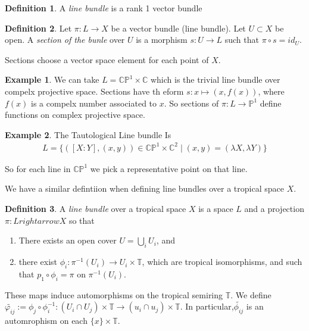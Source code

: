 \documentclass[11pt]{article}
\theoremstyle{definition}
\newtheorem{protoexample}{Example}[section]
\newenvironment{ex}
   {\begin{protoexample}}
   {\end{protoexample}}
\newtheorem{protodefinition}{Definition}[section]
\newenvironment{define}
   {\begin{protodefinition}}
   {\end{protodefinition}}
\def\CC{{\mathbb C}}
\def\TT{{\mathbb T}}
\def\PP{{\mathbb P}}
\begin{document}
\begin{define}
    A \emph{line bundle} is a rank 1 vector bundle
\end{define}



\begin{define}
    Let $\pi:L \rightarrow X$ be a vector bundle (line bundle). Let $U\subset X$ be open. A \emph{section of the bunle} over $U$ is a morphism $s:U \rightarrow L$ such that $\pi \circ s =id_U$.
\end{define}

Sections choose a vector space element for each point of $X$.

\begin{ex}
    We can take $L= \CC\PP^1 \times \CC$ which is the trivial line bundle over compelx projective space. Sections have th eform $s:x \mapsto (x,f(x))$, where $f(x)$ is a compelx number associated to $x$. So sections of $\pi:L \rightarrow \PP^1$ define functions on complex projective space.
\end{ex}


\begin{ex}
    The Tautological Line bundle Is
    \begin{align*}
        L=\{([X:Y],(x,y)) \in \CC\PP^1 \times \CC^2 \; |\; (x,y) = (\lambda X, \lambda Y)\}
    \end{align*}

    So for each line in $\CC\PP^1$ we pick a representative point on that line.
\end{ex}





We have a similar defintiion when defining line bundles over a tropical space $X$.


\begin{define}
    A \emph{line bundle} over a tropical space $X$ is a space $L$ and a projection $\pi:L rightarrow X$ so that
    \begin{enumerate}
        \item There exists an open cover $U = \bigcup \limits_{i} U_i$, and
        \item there exist $\phi_i:\pi^{-1}(U_i) \rightarrow U_i \times \TT$, which are tropical isomorphisms, and such that $p_1 \circ \phi_i = \pi$ on $\pi^{-1}(U_i)$.
    \end{enumerate}
\end{define}


  These maps induce automorphisms on the tropical semiring $\TT$. We define $\tilde{\varphi_{ij}} := \phi_j \circ \phi_i^{-1}: (U_i \cap U_j) \times \TT \rightarrow (u_i \cap u_j)\times \TT$. In particular,$ \tilde{\phi_{ij}}$ is an automrophism on each $\{x\} \times \TT$.
\end{document}
